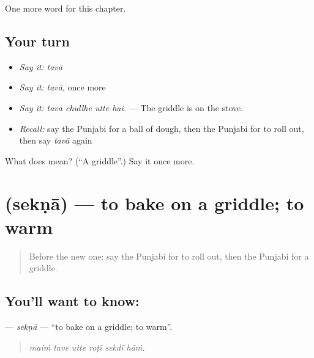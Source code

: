 \begin{grammarlens}[title={What you've built}]
One more word for this chapter.
\end{grammarlens}

\subsection*{Your turn}
\begin{itemize}
\raggedright
  \item \emph{Say it:} \emph{tavā}
  \item \emph{Say it:} \emph{tavā}, once more
  \item \emph{Say it:} \emph{tavā chullhe utte hai.} — The griddle is on the stove.
  \item \emph{Recall:} say the Punjabi for a ball of dough, then the Punjabi for to roll out, then say \emph{tavā} again
\end{itemize}

\begin{tcolorbox}[breakable,colback=teal!4,colframe=teal!35!black,title={Before you move on}]
What does  mean? (\textquotedblleft{}A griddle\textquotedblright{}.) Say it once more.
\end{tcolorbox}
\section[\texorpdfstring{\pa{ਸੇਕਣਾ} (sekṇā)}{ਸੇਕਣਾ (sekṇā)}]{ (sekṇā) — to bake on a griddle; to warm}

\label{lesson:PA-C239-sekna}



\begin{quote}
Before the new one: say the Punjabi for to roll out, then the Punjabi for a griddle.
\end{quote}

\subsection*{You'll want to know: }
\textbf{} — \emph{sekṇā} — \textquotedblleft{}to bake on a griddle; to warm\textquotedblright{}.

\begin{quote}
     
\end{quote}

\begin{quote}
\emph{maiṁ tave utte roṭī sekdī hāṁ.}
\end{quote}

